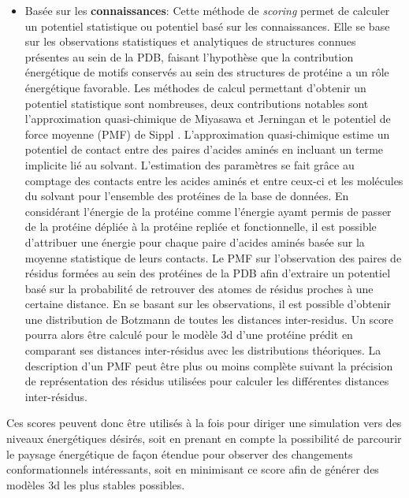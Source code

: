 \begin{itemize}
	\item Basée sur les \textbf{connaissances}: Cette méthode de \textit{scoring} permet de calculer un potentiel statistique ou potentiel basé sur les connaissances. Elle se base sur les observations statistiques et analytiques de structures connues présentes au sein de la PDB, faisant l'hypothèse que la contribution énergétique de motifs conservés au sein des structures de protéine a un rôle énergétique favorable. Les méthodes de calcul permettant d'obtenir un potentiel statistique sont nombreuses, deux contributions notables sont l'approximation quasi-chimique de Miyasawa et Jerningan \cite{miyazawa1985estimation} et le potentiel de force moyenne (PMF) de Sippl \cite{sippl1990calculation}. L'approximation quasi-chimique estime un potentiel de contact entre des paires d'acides aminés en incluant un terme implicite lié au solvant. L'estimation des paramètres se fait grâce au comptage des contacts entre les acides aminés et entre ceux-ci et les molécules du solvant pour l'ensemble des protéines de la base de données. En considérant l'énergie de la protéine comme l'énergie ayamt permis de passer de la protéine dépliée à la protéine repliée et fonctionnelle, il est possible d'attribuer une énergie pour chaque paire d'acides aminés basée sur la moyenne statistique de leurs contacts. Le PMF sur l'observation des paires de résidus formées au sein des protéines de la PDB afin d'extraire un potentiel basé sur la probabilité de retrouver des atomes de résidus proches à une certaine distance. En se basant sur les observations, il est possible d'obtenir une distribution de Botzmann de toutes les distances inter-residus. Un score pourra alors être calculé pour le modèle 3d d'une protéine prédit en comparant ses distances inter-résidus avec les distributions théoriques. La description d'un PMF peut être plus ou moins complète suivant la précision de représentation des résidus utilisées pour calculer les différentes distances inter-résidus.
\end{itemize}

Ces scores peuvent donc être utilisés à la fois pour diriger une simulation vers des niveaux énergétiques désirés, soit en prenant en compte la possibilité de parcourir le paysage énergétique de façon étendue pour observer des changements conformationnels intéressants, soit en minimisant ce score afin de générer des modèles 3d les plus stables possibles.

